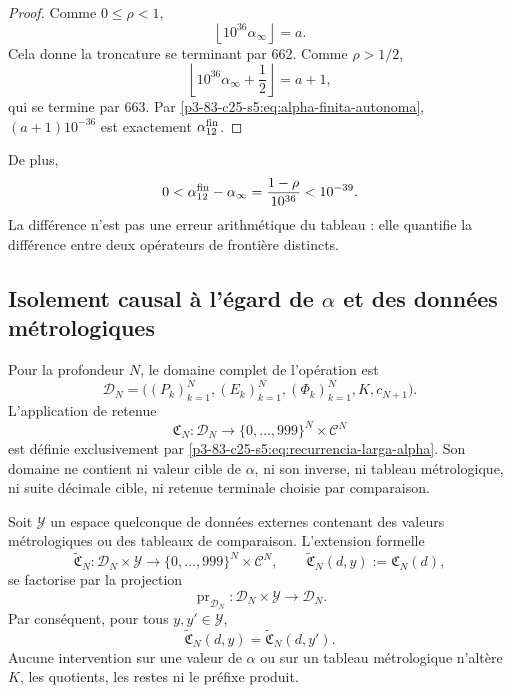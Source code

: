 \begin{proof}
Comme \(0\leq\rho<1\),
\[
 \left\lfloor10^{36}\alpha_\infty\right\rfloor=a.
\]
Cela donne la troncature se terminant par \(662\). Comme \(\rho>1/2\),
\[
 \left\lfloor10^{36}\alpha_\infty+\frac12\right\rfloor=a+1,
\]
qui se termine par \(663\). Par \eqref{p3-83-c25-s5:eq:alpha-finita-autonoma},
\((a+1)10^{-36}\) est exactement \(\alpha_{12}^{\rm fin}\).
\end{proof}

De plus,
\[
 0<\alpha_{12}^{\rm fin}-\alpha_\infty
 =\frac{1-\rho}{10^{36}}<10^{-39}.
\]
La différence n’est pas une erreur arithmétique du tableau : elle quantifie la
différence entre deux opérateurs de frontière distincts.

\subsection{Isolement causal à l’égard de \texorpdfstring{\(\alpha\)}{alpha} et des données métrologiques}

Pour la profondeur \(N\), le domaine complet de l’opération est
\[
 \mathscr D_N
 =\bigl((P_k)_{k=1}^{N},(E_k)_{k=1}^{N},
        (\Phi_k)_{k=1}^{N},K,c_{N+1}\bigr).
\]
L’application de retenue
\[
 \mathfrak C_N:\mathscr D_N
 \longrightarrow
 \{0,\ldots,999\}^{N}\times\mathcal C^{N}
\]
est définie exclusivement par \eqref{p3-83-c25-s5:eq:recurrencia-larga-alpha}. Son
domaine ne contient ni valeur cible de \(\alpha\), ni son inverse, ni tableau
métrologique, ni suite décimale cible, ni retenue terminale choisie par
comparaison.

\begin{theorem}
\label{p3-83-c25-s5:thm:no-interferencia-metrologica-alpha}
Soit \(\mathscr Y\) un espace quelconque de données externes contenant des valeurs
métrologiques ou des tableaux de comparaison. L’extension formelle
\[
 \widetilde{\mathfrak C}_N:
 \mathscr D_N\times\mathscr Y
 \longrightarrow
 \{0,\ldots,999\}^{N}\times\mathcal C^{N},
 \qquad
 \widetilde{\mathfrak C}_N(d,y):=\mathfrak C_N(d),
\]
se factorise par la projection
\[
 \operatorname{pr}_{\mathscr D_N}:
 \mathscr D_N\times\mathscr Y\longrightarrow\mathscr D_N.
\]
Par conséquent, pour tous \(y,y'\in\mathscr Y\),
\[
 \widetilde{\mathfrak C}_N(d,y)
 =\widetilde{\mathfrak C}_N(d,y').
\]
Aucune intervention sur une valeur de \(\alpha\) ou sur un tableau
métrologique n’altère \(K\), les quotients, les restes ni le préfixe produit.
\end{theorem}

